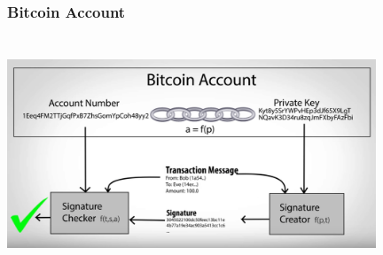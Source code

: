 \documentclass{beamer}
\begin{document}
\begin{frame}
  \frametitle{Bitcoin Account}
    \includegraphics[width=11cm, height=7cm]{privatekey}
\end{frame}
\end{document}
